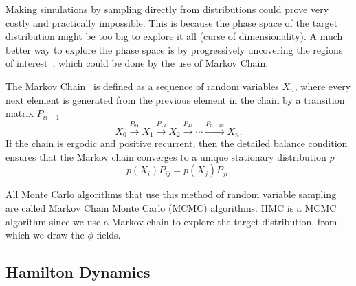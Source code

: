 Making simulations by sampling directly from distributions could prove very costly and practically impossible. This is because the phase space of the target distribution might be too big to explore it all (curse of dimensionality). A much better way to explore the phase space is by progressively uncovering the regions of interest~\cite{mhexpl}, which could be done by the use of Markov Chain.

The Markov Chain~\cite{intromarkov} is defined as a sequence of random variables $X_n$, where every next element is generated from the previous element in the chain by a transition matrix $P_{ii+1}$
\begin{equation}
    X_0 \xrightarrow{P_{01}} X_1 \xrightarrow{P_{12}} X_2 \xrightarrow{P_{23}} \cdots \xrightarrow{P_{n-1n}} X_n.
\end{equation}
If the chain is ergodic and positive recurrent, then the detailed balance condition ensures that the Markov chain converges to a unique stationary distribution $p$
\begin{equation}
    p(X_i) P_{ij} = p(X_j) P_{ji}.
\end{equation}

All Monte Carlo algorithms that use this method of random variable sampling are called Markov Chain Monte Carlo (MCMC) algorithms. HMC is a MCMC algorithm since we use a Markov chain to explore the target distribution, from which we draw the $\phi$ fields.

\subsection{Hamilton Dynamics}


